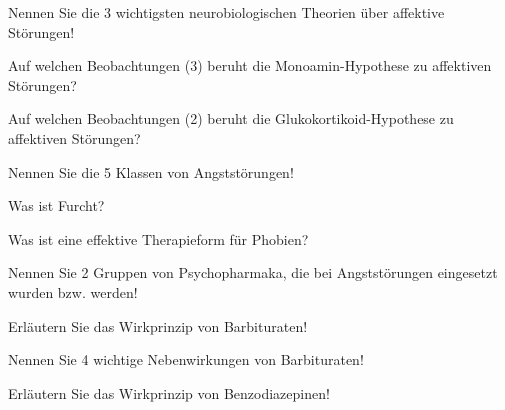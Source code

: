 \documentclass[10pt, a4paper]{exam}
\begin{document}
\begin{questions}
\begin{solution}
  \end{solution}

  \question Nennen Sie die 3 wichtigsten neurobiologischen Theorien über affektive Störungen!
  \begin{solution}

  \end{solution}

  \question Auf welchen Beobachtungen (3) beruht die Monoamin-Hypothese zu affektiven Störungen?
  \begin{solution}

  \end{solution}

  \question Auf welchen Beobachtungen (2) beruht die Glukokortikoid-Hypothese zu affektiven Störungen?
  \begin{solution}

  \end{solution}

  \question Nennen Sie die 5 Klassen von Angststörungen!
  \begin{solution}

  \end{solution}

  \question Was ist Furcht?
  \begin{solution}

  \end{solution}

  \question Was ist eine effektive Therapieform für Phobien?
  \begin{solution}

  \end{solution}

  \question Nennen Sie 2 Gruppen von Psychopharmaka, die bei Angststörungen eingesetzt wurden bzw. werden!
  \begin{solution}

  \end{solution}

  \question Erläutern Sie das Wirkprinzip von Barbituraten!
  \begin{solution}

  \end{solution}

  \question Nennen Sie 4 wichtige Nebenwirkungen von Barbituraten!
  \begin{solution}

  \end{solution}

  \question Erläutern Sie das Wirkprinzip von Benzodiazepinen!
  \begin{solution}


\end{solution}
\end{questions}
\end{document}
